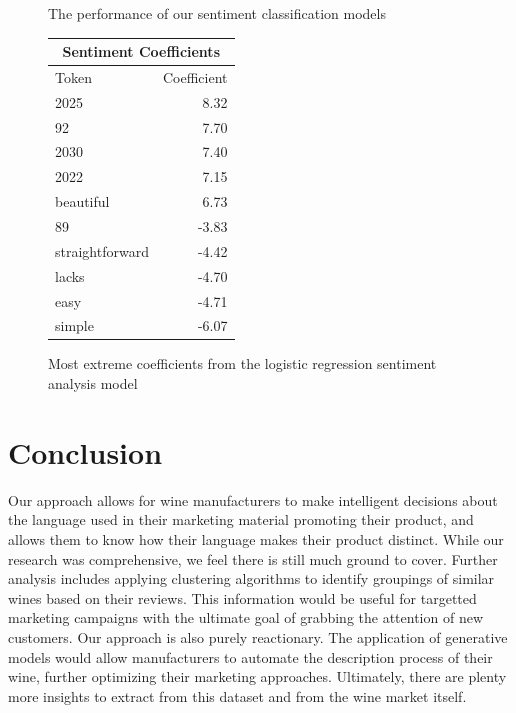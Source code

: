 \documentclass[12pt]{IEEEtran}
\begin{document}
\begin{figure}[H]
\centering
    \caption{ The performance of our sentiment classification models }
    \label{sentiment_results}
\end{figure}

\begin{figure}[H]
    \centering
    \begin{tabular}{ |l|r| }
        \hline
        \multicolumn{2}{|c|}{Sentiment Coefficients} \\
        \hline
        Token & Coefficient \\
        \hline
        2025 & 8.32 \\
        92 & 7.70 \\
        2030 & 7.40 \\
        2022 & 7.15 \\
        beautiful & 6.73 \\
        \hline
        89 & -3.83 \\
        straightforward & -4.42 \\
        lacks & -4.70 \\
        easy & -4.71 \\
        simple & -6.07 \\
        \hline
    \end{tabular}
    \caption{Most extreme coefficients from the logistic regression sentiment analysis model}
    \label{sentiment_coefficients}
\end{figure}
\section{Conclusion}
    Our approach allows for wine manufacturers to make intelligent decisions about the language used in their marketing material promoting their product, and allows them to know how their language makes their product distinct. While our research was comprehensive, we feel there is still much ground to cover. Further analysis includes applying clustering algorithms to identify groupings of similar wines based on their reviews. This information would be useful for targetted marketing campaigns with the ultimate goal of grabbing the attention of new customers. Our approach is also purely reactionary. The application of generative models would allow manufacturers to automate the description process of their wine, further optimizing their marketing approaches. Ultimately, there are plenty more insights to extract from this dataset and from the wine market itself.
\end{document}
